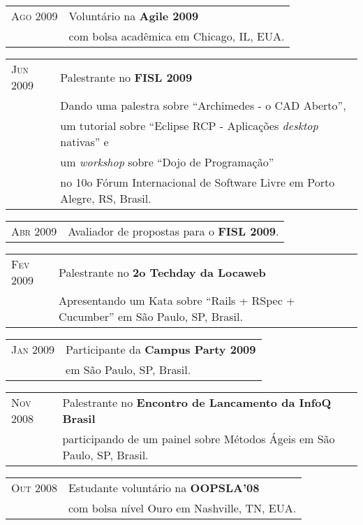 \documentclass[letter,10pt]{article}
\begin{document}
\begin{tabular}{p{2.5cm}l}
  \textsc{Ago 2009} & Voluntário na \textbf{Agile 2009}\\
  & com bolsa acadêmica em Chicago, IL, EUA.\\
\end{tabular}

\begin{tabular}{p{2.5cm}l}
  \textsc{Jun 2009} & Palestrante no \textbf{FISL 2009}\\
  &Dando uma palestra sobre ``Archimedes - o CAD Aberto'',\\
  & um tutorial sobre ``Eclipse RCP - Aplicações \textit{desktop} nativas'' e\\
  & um \textit{workshop} sobre ``Dojo de Programação''\\
  & no 10o Fórum Internacional de Software Livre em Porto
  Alegre, RS, Brasil.
\end{tabular}

\begin{tabular}{p{2.5cm}l}
  \textsc{Abr 2009} & Avaliador de propostas para o \textbf{FISL 2009}.\\
\end{tabular}

\begin{tabular}{p{2.5cm}l}
  \textsc{Fev 2009} & Palestrante no \textbf{2o Techday da Locaweb}\\
  & Apresentando um Kata sobre ``Rails + RSpec + Cucumber'' em São Paulo, SP, Brasil.\\
\end{tabular}

\begin{tabular}{p{2.5cm}l}
  \textsc{Jan 2009} & Participante da \textbf{Campus Party 2009}\\
  &em São Paulo, SP, Brasil.\\
\end{tabular}

\begin{tabular}{p{2.5cm}l}
  \textsc{Nov 2008} & Palestrante no \textbf{Encontro de Lancamento da
    InfoQ Brasil}\\
  & participando de um painel sobre Métodos Ágeis em São Paulo, SP, Brasil.\\
\end{tabular}

\begin{tabular}{p{2.5cm}l}
  \textsc{Out 2008} & Estudante voluntário na \textbf{OOPSLA'08}\\
  & com bolsa nível Ouro em Nashville, TN, EUA.\\
\end{tabular}
\end{document}
